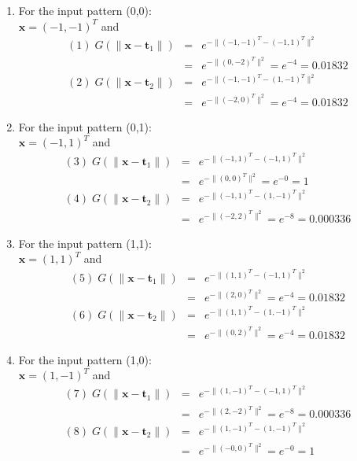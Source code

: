 \documentclass[10pt]{article}
\begin{document}
\begin{enumerate}
\begin{enumerate}
\item For the input pattern (0,0):\\
$\mathbf{x}=(-1,-1)^T$ and
\begin{eqnarray*}
(1)\;G(\|\mathbf{x}-\mathbf{t}_1\|)&=&e^{-\|(-1,-1)^T-(-1,1)^T\|^2}\\
&=&e^{-\|(0,-2)^T\|^2}=e^{-4}=0.01832\\
(2)\;G(\|\mathbf{x}-\mathbf{t}_2\|)&=&e^{-\|(-1,-1)^T-(1,-1)^T\|^2}\\
&=&e^{-\|(-2,0)^T\|^2}=e^{-4}=0.01832
\end{eqnarray*}

\item For the input pattern (0,1):\\
$\mathbf{x}=(-1,1)^T$ and
\begin{eqnarray*}
(3)\;G(\|\mathbf{x}-\mathbf{t}_1\|)&=&e^{-\|(-1,1)^T-(-1,1)^T\|^2}\\
&=&e^{-\|(0,0)^T\|^2}=e^{-0}=1\\
(4)\;G(\|\mathbf{x}-\mathbf{t}_2\|)&=&e^{-\|(-1,1)^T-(1,-1)^T\|^2}\\
&=&e^{-\|(-2,2)^T\|^2}=e^{-8}=0.000336
\end{eqnarray*}

\item For the input pattern (1,1):\\
$\mathbf{x}=(1,1)^T$ and
\begin{eqnarray*}
(5)\;G(\|\mathbf{x}-\mathbf{t}_1\|)&=&e^{-\|(1,1)^T-(-1,1)^T\|^2}\\
&=&e^{-\|(2,0)^T\|^2}=e^{-4}=0.01832\\
(6)\;G(\|\mathbf{x}-\mathbf{t}_2\|)&=&e^{-\|(1,1)^T-(1,-1)^T\|^2}\\
&=&e^{-\|(0,2)^T\|^2}=e^{-4}=0.01832
\end{eqnarray*}

\item For the input pattern (1,0):\\
$\mathbf{x}=(1,-1)^T$ and
\begin{eqnarray*}
(7)\;G(\|\mathbf{x}-\mathbf{t}_1\|)&=&e^{-\|(1,-1)^T-(-1,1)^T\|^2}\\
&=&e^{-\|(2,-2)^T\|^2}=e^{-8}=0.000336\\
(8)\;G(\|\mathbf{x}-\mathbf{t}_2\|)&=&e^{-\|(1,-1)^T-(1,-1)^T\|^2}\\
&=&e^{-\|(-0,0)^T\|^2}=e^{-0}=1
\end{eqnarray*}
\end{enumerate}


\end{enumerate}
\end{document}
